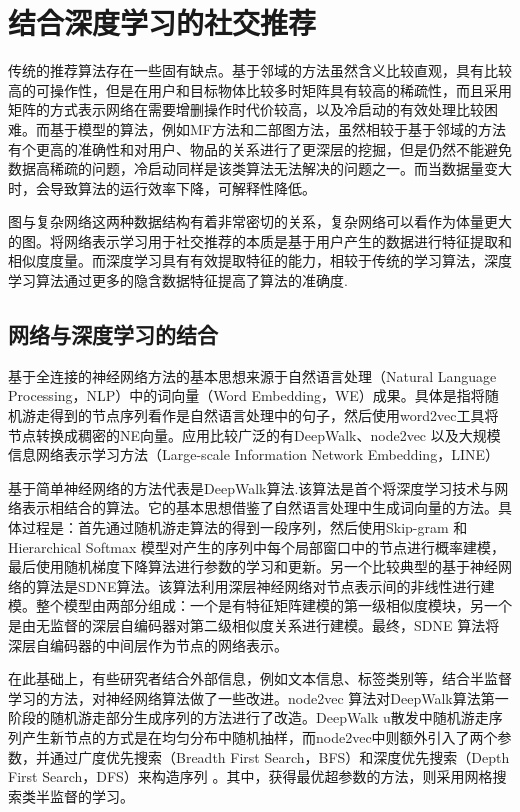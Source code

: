 \section{结合深度学习的社交推荐}
传统的推荐算法存在一些固有缺点。基于邻域的方法虽然含义比较直观，具有比较高的可操作性，但是在用户和目标物体比较多时矩阵具有较高的稀疏性，而且采用矩阵的方式表示网络在需要增删操作时代价较高，以及冷启动的有效处理比较困难。而基于模型的算法，例如MF方法和二部图方法，虽然相较于基于邻域的方法有个更高的准确性和对用户、物品的关系进行了更深层的挖掘，但是仍然不能避免数据高稀疏的问题，冷启动同样是该类算法无法解决的问题之一。而当数据量变大时，会导致算法的运行效率下降，可解释性降低。


图与复杂网络这两种数据结构有着非常密切的关系，复杂网络可以看作为体量更大的图\cite{lu2011link}。将网络表示学习用于社交推荐的本质是基于用户产生的数据进行特征提取和相似度度量\cite{Ma2008SoRecSR}。而深度学习具有有效提取特征的能力，相较于传统的学习算法，深度学习算法通过更多的隐含数据特征提高了算法的准确度\cite{Singhl2017UseOD}.

\subsection{网络与深度学习的结合}

基于全连接的神经网络方法的基本思想来源于自然语言处理（Natural  Language Processing，NLP）中的词向量（Word Embedding，WE）成果。具体是指将随机游走得到的节点序列看作是自然语言处理中的句子，然后使用word2vec工具将节点转换成稠密的NE向量。应用比较广泛的有DeepWalk、node2vec 以及大规模信息网络表示学习方法（Large-scale Information Network Embedding，LINE）\cite{tang2015line}

基于简单神经网络的方法代表是DeepWalk算法\cite{Perozzi2014DeepWalkOL}.该算法是首个将深度学习技术与网络表示相结合的算法。它的基本思想借鉴了自然语言处理中生成词向量的方法\cite{Goldberg2014word2vecED}。具体过程是：首先通过随机游走算法的得到一段序列，然后使用Skip-gram 和Hierarchical Softmax \cite{mikolov2013efficient}模型对产生的序列中每个局部窗口中的节点进行概率建模，最后使用随机梯度下降算法进行参数的学习和更新。另一个比较典型的基于神经网络的算法是SDNE算法\cite{wang2016structural}。该算法利用深层神经网络对节点表示间的非线性进行建模。整个模型由两部分组成：一个是有特征矩阵建模的第一级相似度模块，另一个是由无监督的深层自编码器对第二级相似度关系进行建模。最终，SDNE 算法将深层自编码器的中间层作为节点的网络表示。 

在此基础上，有些研究者结合外部信息，例如文本信息、标签类别等，结合半监督学习的方法，对神经网络算法做了一些改进。node2vec 算法\cite{grover2016node2vec}对DeepWalk算法第一阶段的随机游走部分生成序列的方法进行了改造。DeepWalk u散发中随机游走序列产生新节点的方式是在均匀分布中随机抽样，而node2vec中则额外引入了两个参数，并通过广度优先搜索（Breadth First Search，BFS）和深度优先搜索（Depth First Search，DFS）来构造序列\cite{beamer2012direction} \cite{tarjan1972depth}。其中，获得最优超参数的方法，则采用网格搜索类半监督的学习。


